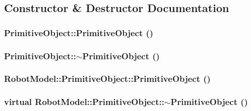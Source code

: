 \subsection{Constructor \& Destructor Documentation}
\hypertarget{class_robot_model_1_1_primitive_object_ad8db4622c9ec75d92c70f4fba00863bf}{
\subsubsection[{PrimitiveObject}]{\setlength{\rightskip}{0pt plus 5cm}PrimitiveObject::PrimitiveObject ()}}
\label{class_robot_model_1_1_primitive_object_ad8db4622c9ec75d92c70f4fba00863bf}
\hypertarget{class_robot_model_1_1_primitive_object_a30e56bb8d777bf91ec7627fdfa0073b2}{
\subsubsection[{$\sim$PrimitiveObject}]{\setlength{\rightskip}{0pt plus 5cm}PrimitiveObject::$\sim$PrimitiveObject ()}}
\label{class_robot_model_1_1_primitive_object_a30e56bb8d777bf91ec7627fdfa0073b2}
\hypertarget{class_robot_model_1_1_primitive_object_a93382341d2ad150badc6b28300e8047b}{
\subsubsection[{PrimitiveObject}]{\setlength{\rightskip}{0pt plus 5cm}RobotModel::PrimitiveObject::PrimitiveObject ()}}
\label{class_robot_model_1_1_primitive_object_a93382341d2ad150badc6b28300e8047b}
\hypertarget{class_robot_model_1_1_primitive_object_aaa5d9d16c5eb4122376afc32ad9fd3d8}{
\subsubsection[{$\sim$PrimitiveObject}]{\setlength{\rightskip}{0pt plus 5cm}virtual RobotModel::PrimitiveObject::$\sim$PrimitiveObject ()}}
\label{class_robot_model_1_1_primitive_object_aaa5d9d16c5eb4122376afc32ad9fd3d8}


